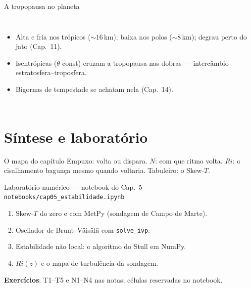 \documentclass[aspectratio=169,11pt]{beamer}
\begin{document}
\begin{frame}{A tropopausa no planeta}
  \begin{columns}
    \begin{itemize}
      \item Alta e fria nos trópicos ($\sim16$\,km); baixa nos polos
            ($\sim8$\,km); degrau perto do jato (Cap.~11).
      \item Isentrópicas ($\theta$ const) cruzam a tropopausa nas
            dobras — intercâmbio estratosfera--troposfera.
      \item Bigornas de tempestade se achatam nela (Cap.~14).
    \end{itemize}
  \end{columns}
\end{frame}

\section{Síntese e laboratório}

\begin{frame}{O mapa do capítulo}
  \vspace{0.6em}
  Empuxo: volta ou dispara. $N$: com que ritmo volta. $Ri$: o
  cisalhamento bagunça mesmo quando voltaria. Tabuleiro: o Skew-$T$.
\end{frame}

\begin{frame}{Laboratório numérico --- notebook do Cap.~5}
  \texttt{notebooks/cap05\_estabilidade.ipynb}
  \begin{enumerate}
    \item Skew-$T$ do zero e com MetPy (sondagem de Campo de Marte).
    \item Oscilador de Brunt--Väisälä com \texttt{solve\_ivp}.
    \item Estabilidade não local: o algoritmo do Stull em NumPy.
    \item $Ri(z)$ e o mapa de turbulência da sondagem.
  \end{enumerate}
  \vspace{0.4em}
  \textbf{Exercícios}: T1--T5 e N1--N4 nas notas; células reservadas no
  notebook.
  \vfill
  \atribuicao
\end{frame}
\end{document}
